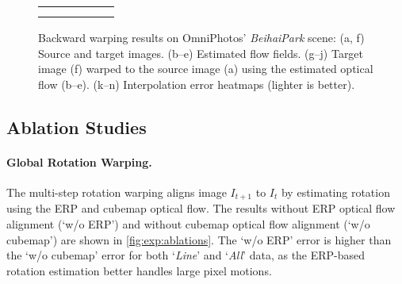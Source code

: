 \begin{figure}[hbt!]
\begin{tabular}{@{}c*{5}{@{\hspace{-8pt}}c}@{}}
	\\[-1.0em]
	 &
	 &
	 &
	 &
	\\[-1.0em]
	&
	 &
	 &
	 &
\end{tabular}
	\caption{\label{fig:exp:backwardwarp}%
		Backward warping results on OmniPhotos' \emph{BeihaiPark} scene:
		(a, f) Source and target images.
		(b–e) Estimated flow fields.
		(g–j) Target image (f) warped to the source image (a) using the estimated optical flow (b–e).
		(k–n) Interpolation error heatmaps (lighter is better).}
\end{figure}


\subsection{Ablation Studies}
\label{sec:ablations}

\paragraph{Global Rotation Warping.}
The multi-step rotation warping aligns image $I_{t+1}$ to $I_t$ by estimating rotation using the ERP and cubemap optical flow.
The results without ERP optical flow alignment (`w/o ERP') and without cubemap optical flow alignment (`w/o cubemap') are shown in \cref{fig:exp:ablations}.
The `w/o ERP' error is higher than the `w/o cubemap' error for both `\emph{Line}' and `\emph{All}' data,
as the ERP-based rotation estimation better handles large pixel motions.


